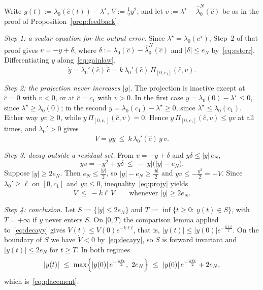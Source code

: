 \documentclass[letterpaper, 10pt, conference]{ieeeconf}
\makeatletter
\newcommand{\rev}[1]{#1}
\renewenvironment{proof}[1][\proofname]{\par
  \pushQED{\qed}%
  \normalfont\topsep6\p@\@plus6\p@\relax
  \trivlist
  \item[\hskip\labelsep\itshape #1\@addpunct{.}]\ignorespaces
}{%
  \popQED\endtrivlist\@endpefalse
}
\renewenvironment{proof}[1][\proofname]{\par
  \pushQED{\qed}%
  \normalfont\topsep6\p@\@plus6\p@\relax
  \trivlist
  \item[\hskip\labelsep\itshape #1\@addpunct{.}]\ignorespaces
}{%
  \popQED\endtrivlist\@endpefalse
}
\makeatother
\begin{document}
\begin{proof}
\rev{Write $y(t):=\lambda_0(\widehat c(t))-\lambda^\star$,
$V:=\frac{1}{2}y^2$, and let $v:=\lambda^\star-\widehat\lambda_0^N(\widehat c)$
be as in the proof of Proposition~\ref{prop:feedback}.}

\rev{\emph{Step 1: a scalar equation for the output error.} Since
$\lambda^\star=\lambda_0(c^\star)$, Step~2 of that proof gives $v=-y+\delta$,
where $\delta:=\lambda_0(\widehat c)-\widehat\lambda_0^N(\widehat c)$ and
$|\delta|\le e_N$ by~\eqref{eq:esterr}. Differentiating $y$
along~\eqref{eq:gainlaw},}
\[
\dot y=\lambda_0'(\widehat c)\,\dot{\widehat c}
=k\,\lambda_0'(\widehat c)\,\Pi_{[0,c_1]}(\widehat c,v).
\]

\rev{\emph{Step 2: the projection never increases $|y|$.} The projection is
inactive except at $\widehat c=0$ with $v<0$, or at $\widehat c=c_1$ with
$v>0$. In the first case $y=\lambda_0(0)-\lambda^\star\le0$, since
$\lambda^\star\ge\lambda_0(0)$; in the second
$y=\lambda_0(c_1)-\lambda^\star\ge0$, since $\lambda^\star\le\lambda_0(c_1)$.
Either way $yv\ge0$, while $y\,\Pi_{[0,c_1]}(\widehat c,v)=0$. Hence
$y\,\Pi_{[0,c_1]}(\widehat c,v)\le yv$ at all times, and $\lambda_0'>0$ gives}
\begin{equation}
\rev{\dot V=y\dot y\ \le\ k\,\lambda_0'(\widehat c)\,y\,v .}
\label{eq:projy}
\end{equation}

\rev{\emph{Step 3: decay outside a residual set.} From $v=-y+\delta$ and
$y\delta\le|y|\,e_N$,}
\[
yv=-y^2+y\delta\ \le\ -|y|\bigl(|y|-e_N\bigr).
\]
\rev{Suppose $|y|\ge2e_N$. Then $e_N\le\frac{|y|}{2}$, so
$|y|-e_N\ge\frac{|y|}{2}$ and $yv\le-\frac{y^2}{2}=-V$. Since
$\lambda_0'\ge\ell$ on $[0,c_1]$ and $yv\le0$, inequality~\eqref{eq:projy}
yields}
\begin{equation}
\rev{\dot V\ \le\ -k\ell\,V
\qquad\text{whenever }|y|\ge2e_N .}
\label{eq:decayy}
\end{equation}

\rev{\emph{Step 4: conclusion.} Let $S:=\{|y|\le2e_N\}$ and
$T:=\inf\{t\ge0:\ y(t)\in S\}$, with $T=+\infty$ if $y$ never enters $S$. On
$[0,T)$ the comparison lemma applied to~\eqref{eq:decayy} gives
$V(t)\le V(0)e^{-k\ell t}$, that is,
$|y(t)|\le|y(0)|e^{-\frac{k\ell t}{2}}$. On the boundary of $S$ we have
$\dot V<0$ by~\eqref{eq:decayy}, so $S$ is forward invariant and
$|y(t)|\le2e_N$ for $t\ge T$. In both regimes}
\[
|y(t)|\ \le\ \max\Bigl\{|y(0)|\,e^{-\frac{k\ell t}{2}},\ 2e_N\Bigr\}
\ \le\ |y(0)|\,e^{-\frac{k\ell t}{2}}+2e_N ,
\]
\rev{which is~\eqref{eq:placement}.}
\end{proof}
\end{document}
